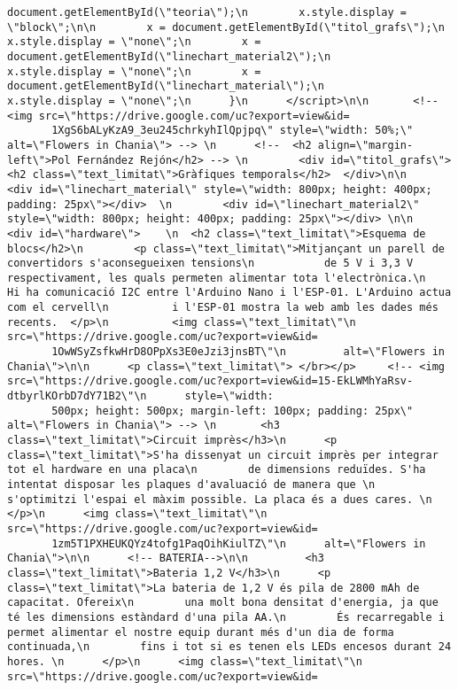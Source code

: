 \begin{lstlisting}[style=myArduino]
       document.getElementById(\"teoria\");\n        x.style.display = \"block\";\n\n        x = document.getElementById(\"titol_grafs\");\n        x.style.display = \"none\";\n        x = document.getElementById(\"linechart_material2\");\n        x.style.display = \"none\";\n        x = document.getElementById(\"linechart_material\");\n        x.style.display = \"none\";\n      }\n      </script>\n\n       <!-- <img src=\"https://drive.google.com/uc?export=view&id=
       1XgS6bALyKzA9_3eu245chrkyhIlQpjpq\" style=\"width: 50%;\" alt=\"Flowers in Chania\"> --> \n      <!--  <h2 align=\"margin-left\">Pol Fernández Rejón</h2> --> \n        <div id=\"titol_grafs\"><h2 class=\"text_limitat\">Gràfiques temporals</h2>  </div>\n\n        <div id=\"linechart_material\" style=\"width: 800px; height: 400px; padding: 25px\"></div>  \n        <div id=\"linechart_material2\" style=\"width: 800px; height: 400px; padding: 25px\"></div> \n\n      <div id=\"hardware\">    \n  <h2 class=\"text_limitat\">Esquema de blocs</h2>\n        <p class=\"text_limitat\">Mitjançant un parell de convertidors s'aconsegueixen tensions\n           de 5 V i 3,3 V respectivament, les quals permeten alimentar tota l'electrònica.\n          Hi ha comunicació I2C entre l'Arduino Nano i l'ESP-01. L'Arduino actua com el cervell\n          i l'ESP-01 mostra la web amb les dades més recents.  </p>\n          <img class=\"text_limitat\"\n          src=\"https://drive.google.com/uc?export=view&id=
       1OwWSyZsfkwHrD8OPpXs3E0eJzi3jnsBT\"\n         alt=\"Flowers in Chania\">\n\n      <p class=\"text_limitat\"> </br></p>     <!-- <img src=\"https://drive.google.com/uc?export=view&id=15-EkLWMhYaRsv-dtbyrlKOrbD7dY71B2\"\n      style=\"width: 
       500px; height: 500px; margin-left: 100px; padding: 25px\" alt=\"Flowers in Chania\"> --> \n       <h3 class=\"text_limitat\">Circuit imprès</h3>\n      <p class=\"text_limitat\">S'ha dissenyat un circuit imprès per integrar tot el hardware en una placa\n        de dimensions reduïdes. S'ha intentat disposar les plaques d'avaluació de manera que \n        s'optimitzi l'espai el màxim possible. La placa és a dues cares. \n      </p>\n      <img class=\"text_limitat\"\n      src=\"https://drive.google.com/uc?export=view&id=
       1zm5T1PXHEUKQYz4tofg1PaqOihKiulTZ\"\n      alt=\"Flowers in Chania\">\n\n      <!-- BATERIA-->\n\n         <h3 class=\"text_limitat\">Bateria 1,2 V</h3>\n      <p class=\"text_limitat\">La bateria de 1,2 V és pila de 2800 mAh de capacitat. Ofereix\n        una molt bona densitat d'energia, ja que té les dimensions estàndard d'una pila AA.\n        És recarregable i permet alimentar el nostre equip durant més d'un dia de forma continuada,\n        fins i tot si es tenen els LEDs encesos durant 24 hores. \n      </p>\n      <img class=\"text_limitat\"\n      src=\"https://drive.google.com/uc?export=view&id=

\end{lstlisting}
